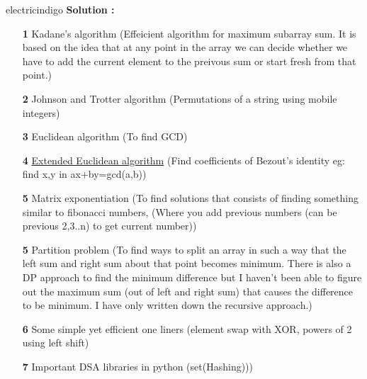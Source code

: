 \documentclass[12pt]{article}
\begin{document}
\begin{mybox}{electricindigo}{}
	\textbf{Solution :} 
	\begin{itemize}
		\item[\textbf{1}] Kadane's algorithm (Effeicient algorithm for maximum subarray sum. It is based on the idea that at any point in the array we can decide whether we have to add the current element to the preivous sum or start fresh from that point.)
		\item[\textbf{2}] Johnson and Trotter algorithm (Permutations of a string using mobile integers) 
		\item[\textbf{3}] Euclidean algorithm (To find GCD) 
		\item[\textbf{4}] \href{https://en.wikipedia.org/wiki/Extended_Euclidean_algorithm}{Extended Euclidean algorithm} (Find coefficients of Bezout's identity eg: find x,y in ax+by=gcd(a,b))
		\item[\textbf{5}] Matrix exponentiation (To find solutions that consists of finding something similar to fibonacci numbers, (Where you add previous numbers (can be previous 2,3..n) to get current number))
		\item[\textbf{5}] Partition problem (To find ways to split an array in such a way that the left sum and right sum about that point becomes minimum. There is also a DP approach to find the minimum difference but I haven't been able to figure out the maximum sum (out of left and right sum) that causes the difference to be minimum. I have only written down the recursive approach.)
		\item[\textbf{6}] Some simple yet efficient one liners (element swap with XOR, powers of 2 using left shift)
		\item[\textbf{7}] Important DSA libraries in python (set(Hashing)))
		
		
		
	\end{itemize}
	

\end{mybox}
\end{document}
